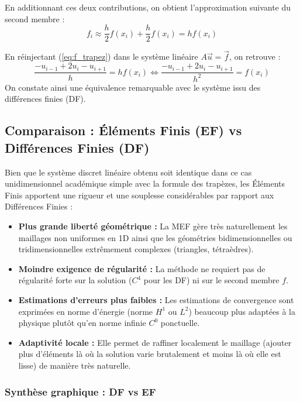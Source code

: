 En additionnant ces deux contributions, on obtient l'approximation suivante du second membre :
\begin{equation}
f_i \approx \frac{h}{2} f(x_i) + \frac{h}{2} f(x_i) = h f(x_i)
\label{eq:f_trapez}
\end{equation}

En réinjectant (\ref{eq:f_trapez}) dans le système linéaire $A \vec{u} = \vec{f}$, on retrouve :
$$\frac{-u_{i-1} + 2u_i - u_{i+1}}{h} = h f(x_i) \iff \frac{-u_{i-1} + 2u_i - u_{i+1}}{h^2} = f(x_i)$$
On constate ainsi une équivalence remarquable avec le système issu des différences finies (DF).

\subsection{Comparaison : Éléments Finis (EF) vs Différences Finies (DF)}

\begin{exemple}
Bien que le système discret linéaire obtenu soit identique dans ce cas unidimensionnel académique simple avec la formule des trapèzes, les Éléments Finis apportent une rigueur et une souplesse considérables par rapport aux Différences Finies :
\begin{itemize}
    \item \textbf{Plus grande liberté géométrique :} La MEF gère très naturellement les maillages non uniformes en 1D ainsi que les géométries bidimensionnelles ou tridimensionnelles extrêmement complexes (triangles, tétraèdres).
    \item \textbf{Moindre exigence de régularité :} La méthode ne requiert pas de régularité forte sur la solution ($C^4$ pour les DF) ni sur le second membre $f$.
    \item \textbf{Estimations d'erreurs plus faibles :} Les estimations de convergence sont exprimées en norme d'énergie (norme $H^1$ ou $L^2$) beaucoup plus adaptées à la physique plutôt qu'en norme infinie $C^0$ ponctuelle.
    \item \textbf{Adaptivité locale :} Elle permet de raffiner localement le maillage (ajouter plus d'éléments là où la solution varie brutalement et moins là où elle est lisse) de manière très naturelle.
\end{itemize}
\end{exemple}

\subsubsection{Synthèse graphique : DF vs EF}

